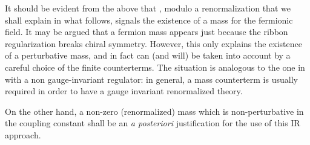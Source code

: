 \documentclass[12pt,a4paper]{article} \usepackage[latin1] {inputenc}
\begin{document}
It should be evident from the above that \myHighlight{$\Sigma$}\coordHE{}, modulo a
renormalization that we shall explain in what follows, signals the
existence of a mass for the fermionic field. It may be argued that a
fermion mass appears just because the ribbon regularization breaks
chiral symmetry. However, this only explains the existence of a
perturbative mass, and in fact can (and will) be taken into account by
a careful choice of the finite counterterms. The situation is
analogous to the one in \coordHE{} with a non gauge-invariant regulator:
in general, a mass counterterm is usually required in order to have a
gauge invariant renormalized theory.

On the other hand, a non-zero (renormalized) mass which is
non-perturbative in the coupling constant shall be an {\em a
  posteriori\/} justification for the use of this IR approach.
\end{document}
